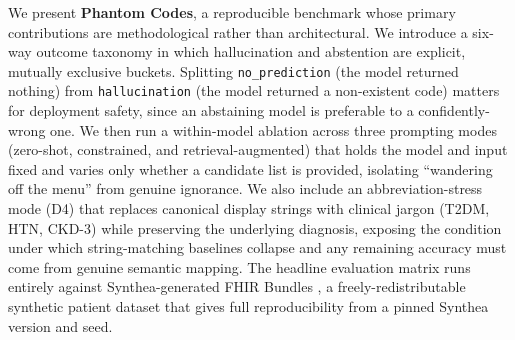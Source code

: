 We present \textbf{Phantom Codes}, a reproducible benchmark whose
primary contributions are methodological rather than
architectural. We introduce a six-way outcome taxonomy in which
hallucination and abstention are explicit, mutually exclusive
buckets. Splitting \texttt{no\_prediction} (the model returned nothing)
from \texttt{hallucination} (the model returned a non-existent code)
matters for deployment safety, since an abstaining model is
preferable to a confidently-wrong one. We then run a within-model
ablation across three prompting modes (zero-shot, constrained,
and retrieval-augmented) that holds the model and input fixed and
varies only whether a candidate list is provided, isolating
``wandering off the menu'' from genuine ignorance. We also include
an abbreviation-stress mode (D4) that replaces canonical display
strings with clinical jargon (T2DM, HTN, CKD-3) while preserving
the underlying diagnosis, exposing the condition under which
string-matching baselines collapse and any remaining accuracy
must come from genuine semantic mapping. The headline evaluation
matrix runs entirely against Synthea-generated FHIR Bundles
\autocite{Walonoski2018}, a freely-redistributable synthetic patient
dataset that gives full reproducibility from a pinned Synthea
version and seed.
